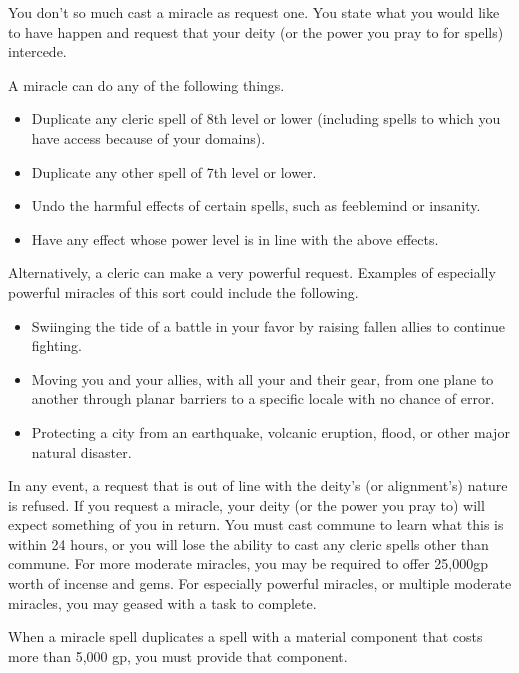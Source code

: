 \spelleffect You don't so much cast a miracle as request one. You state what you would like to have happen and request that your deity (or the power you pray to for spells) intercede.
\par A miracle can do any of the following things.
\begin{itemize}
    \item Duplicate any cleric spell of 8th level or lower (including spells to which you have access because of your domains). 
    \item Duplicate any other spell of 7th level or lower.
    \item Undo the harmful effects of certain spells, such as feeblemind or insanity.
    \item Have any effect whose power level is in line with the above effects.
\end{itemize}
\par Alternatively, a cleric can make a very powerful request. Examples of especially powerful miracles of this sort could include the following.
\begin{itemize}
    \item Swiinging the tide of a battle in your favor by raising fallen allies to continue fighting.
    \item Moving you and your allies, with all your and their gear, from one plane to another through planar barriers to a specific locale with no chance of error.
    \item Protecting a city from an earthquake, volcanic eruption, flood, or other major natural disaster.
\end{itemize}
\par In any event, a request that is out of line with the deity's (or alignment's) nature is refused.
\spellnotes If you request a miracle, your deity (or the power you pray to) will expect something of you in return. You must cast commune to learn what this is within 24 hours, or you will lose the ability to cast any cleric spells other than commune. For more moderate miracles, you may be required to offer 25,000gp worth of incense and gems. For especially powerful miracles, or multiple moderate miracles, you may geased with a task to complete.
\par When a miracle spell duplicates a spell with a material component that costs more than 5,000 gp, you must provide that component.

